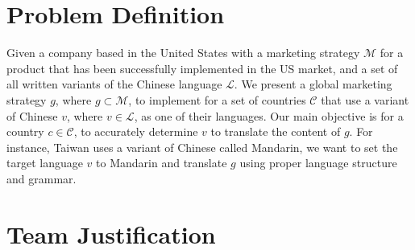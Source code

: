 \documentclass[sigconf]{acmart}
\begin{document}
\section{Problem Definition}
Given a company based in the United States with a marketing strategy $\mathcal{M}$ for a product that has been successfully implemented in the US market, and a set of all written variants of the Chinese language $\mathcal{L}$. We present a global marketing strategy $g$, where $g \subset \mathcal{M}$, to implement for a set of countries $\mathcal{C}$ that use a variant of Chinese $v$, where $v \in \mathcal{L}$, as one of their languages. Our main objective is for a country $c \in \mathcal{C}$, to accurately determine $v$ to translate the content of $g$. For instance, Taiwan uses a variant of Chinese called Mandarin, we want to set the target language $v$ to Mandarin and translate $g$ using proper language structure and grammar.

\section{Team Justification}
\end{document}
